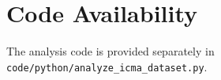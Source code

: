 \section{Code Availability}
The analysis code is provided separately in \texttt{code/python/analyze\_icma\_dataset.py}.
